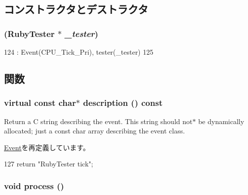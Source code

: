 \subsection{コンストラクタとデストラクタ}
\hypertarget{classRubyTester_1_1CheckStartEvent_a9cbfe98e2db247039e328f1fa0fa9533}{
\subsubsection[{CheckStartEvent}]{ ({\bf RubyTester} $\ast$ {\em \_\-tester})}}
\label{classRubyTester_1_1CheckStartEvent_a9cbfe98e2db247039e328f1fa0fa9533}



\begin{DoxyCode}
124             : Event(CPU_Tick_Pri), tester(_tester)
125         {}
\end{DoxyCode}


\subsection{関数}
\hypertarget{classRubyTester_1_1CheckStartEvent_a130ddddf003422b413e2e891b1b80e8f}{
\subsubsection[{description}]{\setlength{\rightskip}{0pt plus 5cm}virtual const char$\ast$ description () const}}
\label{classRubyTester_1_1CheckStartEvent_a130ddddf003422b413e2e891b1b80e8f}
Return a C string describing the event. This string should not$\ast$ be dynamically allocated; just a const char array describing the event class. 

\hyperlink{classEvent_a130ddddf003422b413e2e891b1b80e8f}{Event}を再定義しています。


\begin{DoxyCode}
127 { return "RubyTester tick"; }
\end{DoxyCode}
\hypertarget{classRubyTester_1_1CheckStartEvent_a2e9c5136d19b1a95fc427e0852deab5c}{
\subsubsection[{process}]{\setlength{\rightskip}{0pt plus 5cm}void process ()}}
\label{classRubyTester_1_1CheckStartEvent_a2e9c5136d19b1a95fc427e0852deab5c}


